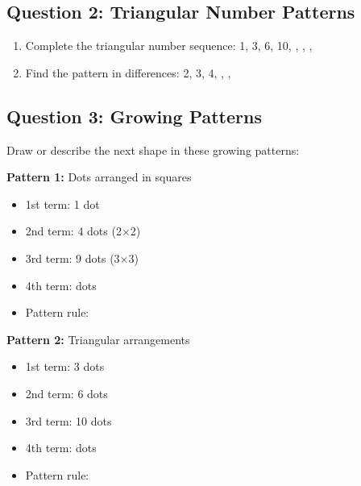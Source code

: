 \documentclass{article}
\begin{document}
\subsection*{Question 2: Triangular Number Patterns}

\begin{enumerate}
    \item Complete the triangular number sequence: 1, 3, 6, 10, \underline{\hspace{1cm}}, \underline{\hspace{1cm}}, \underline{\hspace{1cm}}, \underline{\hspace{1cm}}
    \item Find the pattern in differences: 2, 3, 4, \underline{\hspace{1cm}}, \underline{\hspace{1cm}}, \underline{\hspace{1cm}}
\end{enumerate}

\subsection*{Question 3: Growing Patterns}

Draw or describe the next shape in these growing patterns:

\textbf{Pattern 1:} Dots arranged in squares
\begin{itemize}
    \item 1st term: 1 dot
    \item 2nd term: 4 dots (2×2)
    \item 3rd term: 9 dots (3×3)
    \item 4th term: \underline{\hspace{3cm}} dots
    \item Pattern rule: \underline{\hspace{6cm}}
\end{itemize}

\textbf{Pattern 2:} Triangular arrangements
\begin{itemize}
    \item 1st term: 3 dots
    \item 2nd term: 6 dots
    \item 3rd term: 10 dots
    \item 4th term: \underline{\hspace{3cm}} dots
    \item Pattern rule: \underline{\hspace{6cm}}
\end{itemize}
\end{document}
